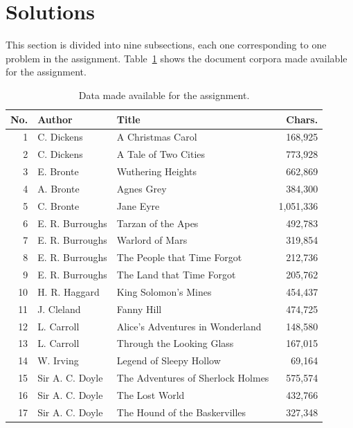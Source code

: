 \documentclass[conference]{IEEEtran}
\begin{document}
\section{Solutions\label{sec:solutions}}

This section is divided into nine subsections, each one corresponding to one problem in the assignment.
Table~\ref{tab:data} shows the document corpora made available for the assignment.

\begin{table}[htb]
\caption{Data made available for the assignment.\label{tab:data}}
\vspace{-18pt}
\begin{center}
\begin{tabular}{r@{\hspace{1.1em}}l@{\hspace{1.1em}}l@{\hspace{0.75em}}r}
\hline
No. & Author & Title & Chars. \\
\hline
1  & C. Dickens & A Christmas Carol & 168,925 \\
2  & C. Dickens & A Tale of Two Cities & 773,928 \\
3  & E. Bronte & Wuthering Heights & 662,869 \\
4  & A. Bronte & Agnes Grey & 384,300 \\
5  & C. Bronte & Jane Eyre & 1,051,336 \\
6  & E. R. Burroughs & Tarzan of the Apes & 492,783 \\
7  & E. R. Burroughs & Warlord of Mars & 319,854 \\
8  & E. R. Burroughs & The People that Time Forgot & 212,736 \\
9  & E. R. Burroughs & The Land that Time Forgot & 205,762 \\
10 & H. R. Haggard & King Solomon's Mines & 454,437 \\
11 & J. Cleland & Fanny Hill & 474,725 \\
12 & L. Carroll & Alice's Adventures in Wonderland & 148,580 \\
13 & L. Carroll & Through the Looking Glass & 167,015 \\
14 & W. Irving & Legend of Sleepy Hollow & 69,164 \\
15 & Sir A. C. Doyle & The Adventures of Sherlock Holmes & 575,574 \\
16 & Sir A. C. Doyle & The Lost World & 432,766 \\
17 & Sir A. C. Doyle & The Hound of the Baskervilles & 327,348 \\

\end{tabular}
\end{center}
\end{table}
\end{document}
